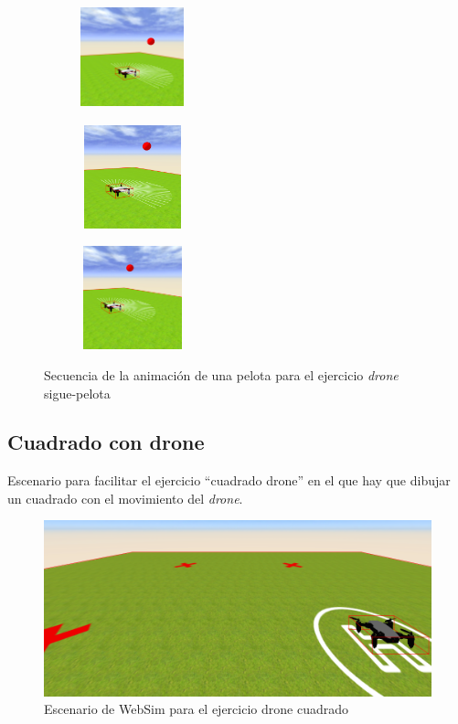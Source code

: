 \begin{figure}[htbp]
\begin{subfigure}[t]{0.2\textwidth}
    \includegraphics[width=3cm, height=3cm]{img/followBallTello10.png}
\label{fig:figure2_10}
\end{subfigure}\hfill
\begin{subfigure}[t]{0.2\textwidth}
    \includegraphics[width=3cm, height=3cm]{img/followBallTello11.png}
\label{fig:figure2_11}
\end{subfigure}\hfill
\begin{subfigure}[t]{0.2\textwidth}
    \includegraphics[width=3cm, height=3cm]{img/followBallTello12.png}
\label{fig:figure2_12}
\end{subfigure}
\caption{Secuencia de la animación de una pelota para el ejercicio \textit{drone} sigue-pelota}
\label{fig:secuenciaDrone}
\end{figure}

\subsection{Cuadrado con drone}

Escenario para facilitar el ejercicio ``cuadrado drone'' en el que hay que dibujar un cuadrado con el movimiento del \textit{drone}.
    
    \begin{figure}[H]
        \centering
        \includegraphics[scale=0.4]{img/cuadradoDrone.png}
        \caption{Escenario de WebSim para el ejercicio drone cuadrado} 
        \label{fig:droneCuadrado}
    \end{figure}
    
